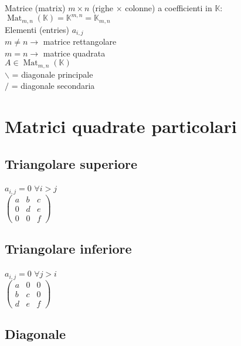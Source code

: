 \documentclass[a4paper, twoside, italian, 11pt]{book}
\DeclareMathOperator{\Mat}{Mat}
\newcommand{\K}{\mathbb K}
\begin{document}
Matrice (matrix) $m \times n$ (righe $\times$ colonne) a coefficienti in $\K$: \\
$\Mat_{m,n}(\K) = \K^{m,n} = \K_{m,n}$ \\

\noindent
Elementi (entries) $a_{i, j}$ \\

\noindent
$m \neq n \rightarrow$ matrice rettangolare \\
$m = n \rightarrow$ matrice quadrata \\

\noindent
$A \in \Mat_{m,n}(\K)$ \\

\noindent
$\backslash$ = diagonale principale \\
$/$ = diagonale secondaria \\



\section{Matrici quadrate particolari}


\subsection{Triangolare superiore}

$a_{i,j} = 0$ $\forall i > j$ \\

\noindent
$\begin{pmatrix}
a & b & c \\
0 & d & e \\
0 & 0 & f
\end{pmatrix}$


\subsection{Triangolare inferiore}

$a_{i,j} = 0$ $\forall j > i$ \\

\noindent
$\begin{pmatrix}
a & 0 & 0 \\
b & c & 0 \\
d & e & f
\end{pmatrix}$


\subsection{Diagonale}
\end{document}
